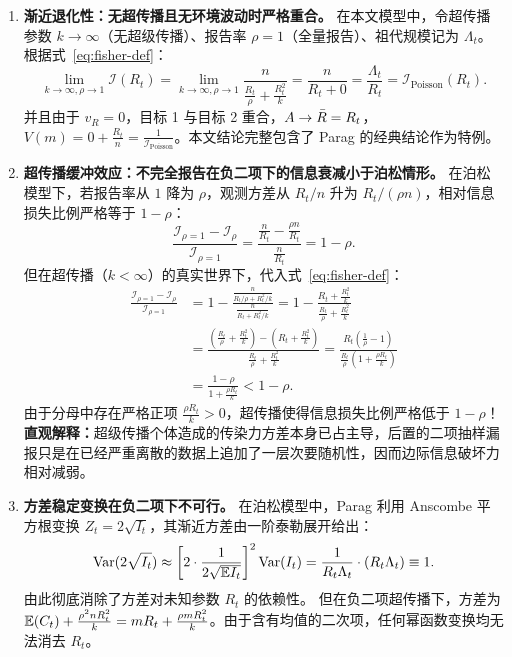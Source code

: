 \begin{enumerate}[label=\textbf{结论 \arabic*：}]
  \item \textbf{渐近退化性：无超传播且无环境波动时严格重合。}
  在本文模型中，令超传播参数 $k \to \infty$（无超级传播）、报告率 $\rho = 1$（全量报告）、祖代规模记为 $\Lambda_t$。根据式~\eqref{eq:fisher-def}：
  \begin{equation}
    \lim_{k \to \infty, \rho \to 1} \mathcal{I}(R_t) = \lim_{k \to \infty, \rho \to 1} \frac{n}{\frac{R_t}{\rho} + \frac{R_t^2}{k}} = \frac{n}{R_t + 0} = \frac{\Lambda_t}{R_t} = \mathcal{I}_{\text{Poisson}}(R_t).
  \end{equation}
  并且由于 $v_R = 0$，目标 1 与目标 2 重合，$A \to \bar{R} = R_t$，$V(m) = 0 + \frac{R_t}{n} = \frac{1}{\mathcal{I}_{\text{Poisson}}}$。本文结论完整包含了 Parag 的经典结论作为特例。

  \item \textbf{超传播缓冲效应：不完全报告在负二项下的信息衰减小于泊松情形。}
  在泊松模型下，若报告率从 $1$ 降为 $\rho$，观测方差从 $R_t/n$ 升为 $R_t/(\rho n)$，相对信息损失比例严格等于 $1 - \rho$：
  \begin{equation}
    \frac{\mathcal{I}_{\rho=1} - \mathcal{I}_\rho}{\mathcal{I}_{\rho=1}} = \frac{\frac{n}{R_t} - \frac{\rho n}{R_t}}{\frac{n}{R_t}} = 1 - \rho.
  \end{equation}
  但在超传播（$k < \infty$）的真实世界下，代入式~\eqref{eq:fisher-def}：
  \begin{align}
    \frac{\mathcal{I}_{\rho=1} - \mathcal{I}_\rho}{\mathcal{I}_{\rho=1}} &= 1 - \frac{\frac{n}{R_t/\rho + R_t^2/k}}{\frac{n}{R_t + R_t^2/k}} = 1 - \frac{R_t + \frac{R_t^2}{k}}{\frac{R_t}{\rho} + \frac{R_t^2}{k}} \nonumber \\
    &= \frac{\left(\frac{R_t}{\rho} + \frac{R_t^2}{k}\right) - \left(R_t + \frac{R_t^2}{k}\right)}{\frac{R_t}{\rho} + \frac{R_t^2}{k}} = \frac{R_t\left(\frac{1}{\rho} - 1\right)}{\frac{R_t}{\rho}\left(1 + \frac{\rho R_t}{k}\right)} \nonumber \\
    &= \frac{1 - \rho}{1 + \frac{\rho R_t}{k}} < 1 - \rho.
  \end{align}
  由于分母中存在严格正项 $\frac{\rho R_t}{k} > 0$，超传播使得信息损失比例严格低于 $1 - \rho$！
  \textbf{直观解释：}超级传播个体造成的传染力方差本身已占主导，后置的二项抽样漏报只是在已经严重离散的数据上追加了一层次要随机性，因而边际信息破坏力相对减弱。

  \item \textbf{方差稳定变换在负二项下不可行。}
  在泊松模型中，Parag 利用 Anscombe 平方根变换 $Z_t = 2\sqrt{I_t}$，其渐近方差由一阶泰勒展开给出：
  \begin{equation}
    \mathrm{Var}(2\sqrt{I_t}) \approx \left[ 2 \cdot \frac{1}{2\sqrt{\mathbb{E} I_t}} \right]^2 \mathrm{Var}(I_t) = \frac{1}{R_t \Lambda_t} \cdot (R_t \Lambda_t) \equiv 1.
  \end{equation}
  由此彻底消除了方差对未知参数 $R_t$ 的依赖性。
  但在负二项超传播下，方差为 $\mathbb{E}(C_t) + \frac{\rho^2 n R_t^2}{k} = m R_t + \frac{\rho m R_t^2}{k}$。由于含有均值的二次项，任何幂函数变换均无法消去 $R_t$。


\end{enumerate}
